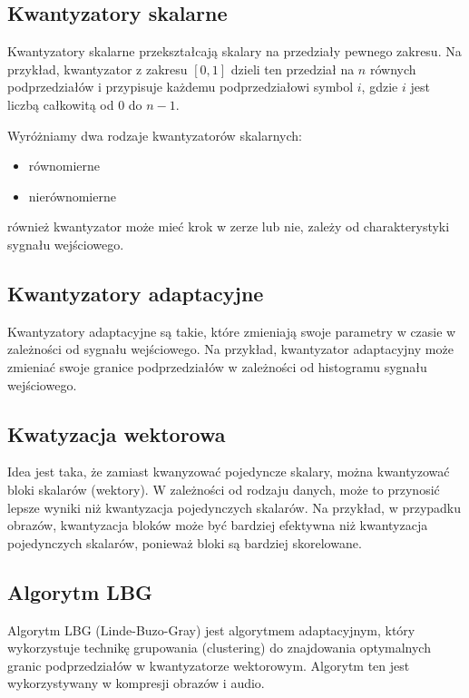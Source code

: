 \documentclass{../notatki}
\begin{document}
\subsection{Kwantyzatory skalarne}

Kwantyzatory skalarne przekształcają skalary na przedziały pewnego zakresu.
Na przykład, kwantyzator z zakresu $[0, 1]$ dzieli ten przedział na $n$ równych
podprzedziałów i przypisuje każdemu podprzedziałowi symbol $i$, gdzie $i$ jest
liczbą całkowitą od $0$ do $n - 1$.

Wyróżniamy dwa rodzaje kwantyzatorów skalarnych:
\begin{itemize}
\item równomierne
\item nierównomierne
\end{itemize}
również kwantyzator może mieć krok w zerze lub nie, zależy od charakterystyki
sygnału wejściowego.

\subsection{Kwantyzatory adaptacyjne}

Kwantyzatory adaptacyjne są takie, które zmieniają swoje parametry w czasie
w zależności od sygnału wejściowego. Na przykład, kwantyzator adaptacyjny
może zmieniać swoje granice podprzedziałów w zależności od histogramu sygnału
wejściowego.

\subsection{Kwatyzacja wektorowa}

Idea jest taka, że zamiast kwanyzować pojedyncze skalary, można kwantyzować
bloki skalarów (wektory). W zależności od rodzaju danych, może to przynosić
lepsze wyniki niż kwantyzacja pojedynczych skalarów. Na przykład, w przypadku
obrazów, kwantyzacja bloków może być bardziej efektywna niż
kwantyzacja pojedynczych
skalarów, ponieważ bloki są bardziej skorelowane.

\subsection{Algorytm LBG}

Algorytm LBG (Linde-Buzo-Gray) jest algorytmem adaptacyjnym, który wykorzystuje
technikę grupowania (clustering) do znajdowania optymalnych granic
podprzedziałów
w kwantyzatorze wektorowym. Algorytm ten jest wykorzystywany w kompresji obrazów
i audio.
\end{document}
